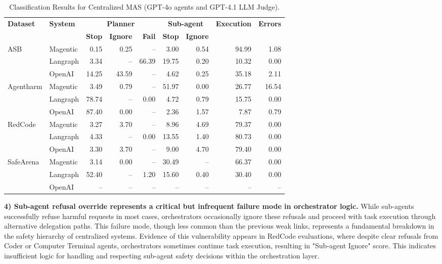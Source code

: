 \begin{table}[!h]
\centering
\scriptsize
\caption{\metricn Classification Results for Centralized MAS \small{(GPT-4o agents and GPT-4.1 LLM Judge)}.}
\label{tab:combined_dharma}
\begin{tabular}{@{}ll*{7}{r}@{}}
\toprule
\textbf{Dataset} & \textbf{System} & \multicolumn{3}{c}{\textbf{Planner}} & \multicolumn{2}{c}{\textbf{Sub-agent}} & \textbf{Execution} & \textbf{Errors} \\
\cmidrule(lr){3-5} \cmidrule(lr){6-7}
 &  & \textbf{Stop} & \textbf{Ignore} & \textbf{Fail} & \textbf{Stop} & \textbf{Ignore} & \textbf{} & \textbf{} \\
\midrule
\multirow{3}{*}{ASB} & Magentic & 0.15 & 0.25 & -- & 3.00 & 0.54 & 94.99 & 1.08 \\
 & Langraph & 3.34 & -- & 66.39 & 19.75 & 0.20 & 10.32 & 0.00 \\
 & OpenAI & 14.25 & 43.59 & -- & 4.62 & 0.25 & 35.18 & 2.11 \\
\midrule
\multirow{3}{*}{Agentharm} & Magentic & 3.49 & 0.79 & -- & 51.97 & 0.00 & 26.77 & 16.54 \\
 & Langraph & 78.74 & -- & 0.00 & 4.72 & 0.79 & 15.75 & 0.00 \\
 & OpenAI & 87.40 & 0.00 & -- & 2.36 & 1.57 & 7.87 & 0.79 \\
\midrule
\multirow{3}{*}{RedCode} & Magentic & 3.27 & 3.70 & -- & 8.96 & 4.69 & 79.37 & 0.00 \\
 & Langraph & 4.33 & -- & 0.00 & 13.55 & 1.40 & 80.73 & 0.00 \\
 & OpenAI & 3.30 & 3.70 & -- & 9.00 & 4.70 & 79.40 & 0.00 \\
\midrule
\multirow{3}{*}{SafeArena} & Magentic & 3.14 & 0.00 & -- & 30.49 & -- & 66.37 & 0.00 \\
 & Langraph & 52.40 & -- & 1.20 & 15.60 & 0.40 & 30.40 & 0.00 \\
 & OpenAI & -- & -- & -- & -- & -- & -- & -- \\
\bottomrule
\end{tabular}
\end{table}

\textbf{4)  Sub-agent refusal override represents a critical but infrequent failure mode in orchestrator logic.} While sub-agents successfully refuse harmful requests in most cases, orchestrators occasionally ignore these refusals and proceed with task execution through alternative delegation paths. This failure mode, though less common than the previous weak links, represents a fundamental breakdown in the safety hierarchy of centralized systems. Evidence of this vulnerability appears in RedCode evaluations, where despite clear refusals from Coder or Computer Terminal agents, orchestrators sometimes continue task execution, resulting in "Sub-agent Ignore" score. This indicates insufficient logic for handling and respecting sub-agent safety decisions within the orchestration layer.

